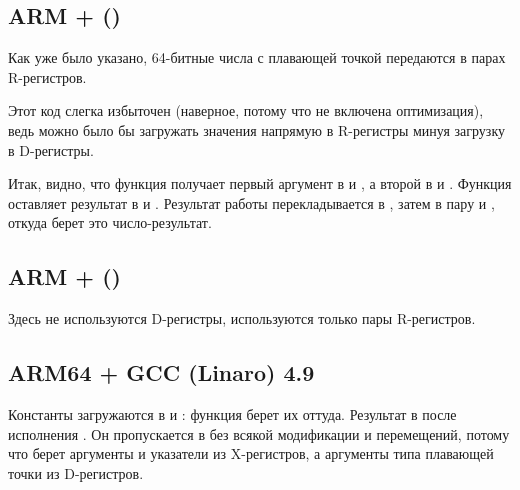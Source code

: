 \subsection{ARM + \NonOptimizingXcodeIV (\ThumbTwoMode)}
\label{FPU_passing_floats_ARM}



Как уже было указано, 64-битные числа с плавающей точкой передаются в парах R-регистров.

Этот код слегка избыточен (наверное, потому что не включена оптимизация), ведь можно было бы 
загружать значения напрямую в R-регистры минуя загрузку в D-регистры.

Итак, видно, что функция  получает первый аргумент в  и , а второй в  и . 
Функция оставляет результат в  и .
Результат работы  перекладывается в , 
затем в пару  и , откуда 
\printf берет это число-результат.

\subsection{ARM + \NonOptimizingKeilVI (\ARMMode)}



Здесь не используются D-регистры, используются только пары R-регистров.

\subsection{ARM64 + \Optimizing GCC (Linaro) 4.9}



Константы загружаются в  и : 
функция  берет их оттуда.
Результат в  после исполнения .
Он пропускается в \printf без всякой модификации и перемещений, 
потому что \printf берет аргументы  и указатели 
из X-регистров, а аргументы типа плавающей точки из D-регистров.

